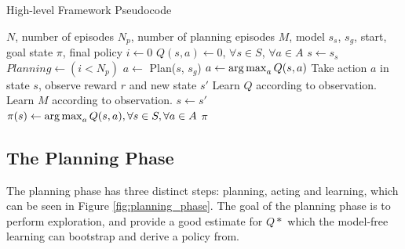 \begin{algorithm}
\caption{High-level Framework Pseudocode}
\label{alg:framework_pc}
\begin{algorithmic}
\REQUIRE $N$, number of episodes
\REQUIRE $N_p$, number of planning episodes
\REQUIRE $M$, model
\REQUIRE $s_s$, $s_g$, start, goal state
\ENSURE $\pi$, final policy
\STATE $i \leftarrow 0$
\STATE $Q(s,a) \leftarrow 0 $, $\forall s \in S$, $\forall a \in A$
\STATE $s \leftarrow s_s$
    \STATE $Planning \leftarrow (i < N_p)$
            \STATE $a \leftarrow$ Plan($s$, $s_g$)
        \ELSE
            \STATE $a \leftarrow \operatorname*{arg\,max}_a Q(s,a)$
        \ENDIF
        \STATE Take action $a$ in state $s$, observe reward $r$ and new state $s'$
        \STATE Learn $Q$ according to observation.
            \STATE Learn $M$ according to observation.
        \ENDIF
        $s \leftarrow s'$
    \ENDWHILE
\ENDFOR
\STATE $\pi(s) \leftarrow \operatorname*{arg\,max}_a Q(s,a), \forall s \in S, \forall a \in A$
\RETURN $\pi$
\end{algorithmic}
\end{algorithm}


\subsection{The Planning Phase}
The planning phase has three distinct steps: planning, acting and learning, which can be seen in Figure \ref{fig:planning_phase}. The goal of the planning phase is to perform exploration, and provide a good estimate for $Q*$ which the model-free learning can bootstrap and derive a policy from.


